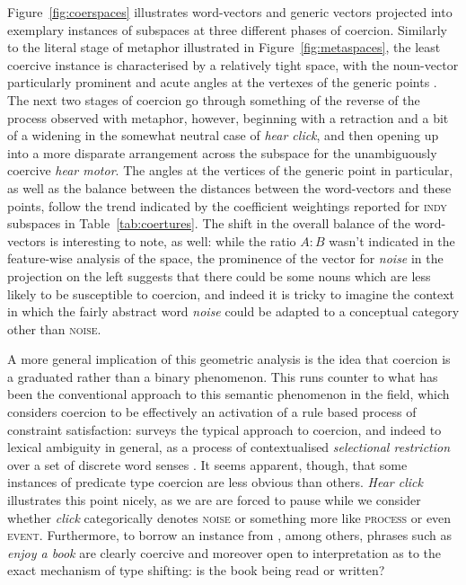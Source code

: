 Figure~\ref{fig:coerspaces} illustrates word-vectors and generic vectors projected into exemplary instances of subspaces at three different phases of coercion.  Similarly to the literal stage of metaphor illustrated in Figure~\ref{fig:metaspaces}, the least coercive instance is characterised by a relatively tight space, with the noun-vector particularly prominent and acute angles at the vertexes of the generic points .  The next two stages of coercion go through something of the reverse of the process observed with metaphor, however, beginning with a retraction and a bit of a widening in the somewhat neutral case of \emph{hear click}, and then opening up into a more disparate arrangement across the subspace for the unambiguously coercive \emph{hear motor}.  The angles at the vertices of the generic point in particular, as well as the balance between the distances between the word-vectors and these points, follow the trend indicated by the coefficient weightings reported for \textsc{indy} subspaces in Table~\ref{tab:coertures}.  The shift in the overall balance of the word-vectors is interesting to note, as well: while the ratio $A:B$ wasn't indicated in the feature-wise analysis of the space, the prominence of the vector for \emph{noise} in the projection on the left suggests that there could be some nouns which are less likely to be susceptible to coercion, and indeed it is tricky to imagine the context in which the fairly abstract word \emph{noise} could be adapted to a conceptual category other than \textsc{noise}.

A more general implication of this geometric analysis is the idea that coercion is a graduated rather than a binary phenomenon.  This runs counter to what has been the conventional approach to this semantic phenomenon in the field, which considers coercion to be effectively an activation of a rule based process of constraint satisfaction: \cite{Pustejovsky1993} surveys the typical approach to coercion, and indeed to lexical ambiguity in general, as a process of contextualised \emph{selectional restriction} over a set of discrete word senses \citep[though see][for computational applications of a probabilistic, corpus based model]{LapataEA2003,ShutovaEA2013b}.  It seems apparent, though, that some instances of predicate type coercion are less obvious than others.  \emph{Hear click} illustrates this point nicely, as we are are forced to pause while we consider whether \emph{click} categorically denotes \textsc{noise} or something more like \textsc{process} or even \textsc{event}.  Furthermore, to borrow an instance from \cite{CopestakeEA1995}, among others, phrases such as \emph{enjoy a book} are clearly coercive and moreover open to interpretation as to the exact mechanism of type shifting: is the book being read or written?

